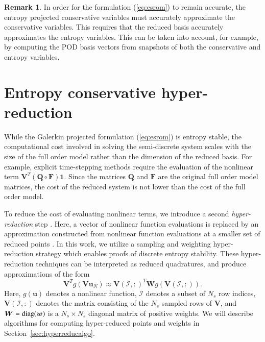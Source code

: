 \documentclass[preprint,10pt]{elsarticle}
\theoremstyle{definition}
\theoremstyle{lemma}
\newtheorem*{remark}{Remark}
\theoremstyle{theorem}
\theoremstyle{assumption}
\newcommand{\LRp}[1]{\left( #1 \right)}
\begin{document}
\begin{remark}
In order for the formulation (\ref{eq:esrom}) to remain accurate, the entropy projected conservative variables must accurately approximate the conservative variables.  This requires that the reduced basis accurately approximates the entropy variables.  This can be taken into account, for example, by computing the POD basis vectors from snapshots of both the conservative and entropy variables.
\end{remark}


\section{Entropy conservative hyper-reduction}
\label{sec:4}
While the Galerkin projected formulation (\ref{eq:esrom}) is entropy stable, the computational cost involved in solving the semi-discrete system scales with the size of the full order model rather than the dimension of the reduced basis.  For example, explicit time-stepping methods require the evaluation of the nonlinear term $\bm{V}^T\LRp{\bm{Q} \circ \bm{F}}\bm{1}$.  Since the matrices $\bm{Q}$ and $\bm{F}$ are the original full order model matrices, the cost of the reduced system is not lower than the cost of the full order model.  

To reduce the cost of evaluating nonlinear terms, we introduce a second \textit{hyper-reduction} step \cite{ryckelynck2009hyper}.  Here, a vector of nonlinear function evaluations is replaced by an approximation constructed from nonlinear function evaluations at a smaller set of reduced points \cite{barrault2004empirical, bui2004aerodynamic, chaturantabut2010nonlinear, farhat2015structure, drmac2016new, hernandez2017dimensional, yano2019lp}.  In this work, we utilize a sampling and weighting hyper-reduction strategy \cite{farhat2015structure, hernandez2017dimensional, yano2019lp} which enables proofs of discrete entropy stability.  These hyper-reduction techniques can be interpreted as reduced quadratures, and produce approximations of the form
\[
\bm{V}^Tg(\bm{V}\bm{u}_N) \approx \bm{V}\LRp{\mathcal{I},:}^T \bm{W} g\LRp{\bm{V}\LRp{\mathcal{I},:}}.
\]
Here, $g(\bm{u})$ denotes a nonlinear function, $\mathcal{I}$ denotes a subset of $N_s$ row indices, $\bm{V}\LRp{\mathcal{I},:}$ denotes the matrix consisting of the $N_s$ sampled rows of $\bm{V}$, and $\bm{W} = {\rm diag}(\bm{w})$ is a $N_s\times N_s$ diagonal matrix of positive weights.  We will describe algorithms for computing hyper-reduced points and weights in Section~\ref{sec:hyperreducalgo}.
\end{document}

